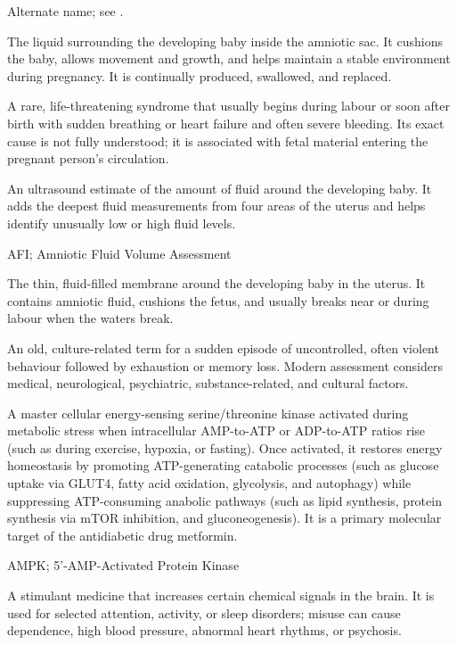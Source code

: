  Alternate name; see .

 The liquid surrounding the developing baby inside the amniotic sac. It cushions the baby, allows movement and growth, and helps maintain a stable environment during pregnancy. It is continually produced, swallowed, and replaced.

 A rare, life-threatening syndrome that usually begins during labour or soon after birth with sudden breathing or heart failure and often severe bleeding. Its exact cause is not fully understood; it is associated with fetal material entering the pregnant person's circulation.

 An ultrasound estimate of the amount of fluid around the developing baby. It adds the deepest fluid measurements from four areas of the uterus and helps identify unusually low or high fluid levels.

\synonyms
AFI; Amniotic Fluid Volume Assessment

 The thin, fluid-filled membrane around the developing baby in the uterus. It contains amniotic fluid, cushions the fetus, and usually breaks near or during labour when the waters break.

 An old, culture-related term for a sudden episode of uncontrolled, often violent behaviour followed by exhaustion or memory loss. Modern assessment considers medical, neurological, psychiatric, substance-related, and cultural factors.

 A master cellular energy-sensing serine/threonine kinase activated during metabolic stress when intracellular AMP-to-ATP or ADP-to-ATP ratios rise (such as during exercise, hypoxia, or fasting). Once activated, it restores energy homeostasis by promoting ATP-generating catabolic processes (such as glucose uptake via GLUT4, fatty acid oxidation, glycolysis, and autophagy) while suppressing ATP-consuming anabolic pathways (such as lipid synthesis, protein synthesis via mTOR inhibition, and gluconeogenesis). It is a primary molecular target of the antidiabetic drug metformin.

\synonyms
AMPK; 5'-AMP-Activated Protein Kinase

 A stimulant medicine that increases certain chemical signals in the brain. It is used for selected attention, activity, or sleep disorders; misuse can cause dependence, high blood pressure, abnormal heart rhythms, or psychosis.

